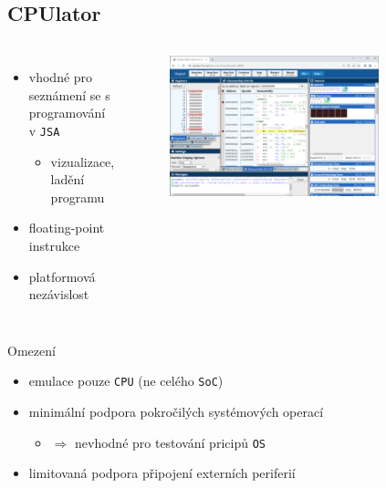 \documentclass[compress]{beamer}
\begin{document}
\subsection{CPUlator}

\begin{frame}
	\begin{columns}
		\begin{itemize}
			\item vhodné pro seznámení se s programování v \texttt{JSA}
			\begin{itemize}
				\item vizualizace, ladění programu
			\end{itemize}
			\item floating-point instrukce
			\item platformová nezávislost
		\end{itemize}
		\begin{figure}
			\centering
			\includegraphics[width=0.8\textwidth]{img/cpulator.png}
			\caption{\href{https://cpulator.01xz.net}{}}
			\label{CPUlator}
		\end{figure}
	\end{columns}
	\noindent\makebox[\linewidth]{\rule{\textwidth}{0.4pt}}
	\begin{block}{Omezení}
		\begin{itemize}
			\item emulace pouze \texttt{CPU} (ne celého \texttt{SoC})
			\item minimální podpora pokročilých systémových operací
			\begin{itemize}
				\item $\Rightarrow$ nevhodné pro testování pricipů \texttt{OS}
			\end{itemize}
			\item limitovaná podpora připojení externích periferií
		\end{itemize}
	\end{block}
\end{frame}
\end{document}
